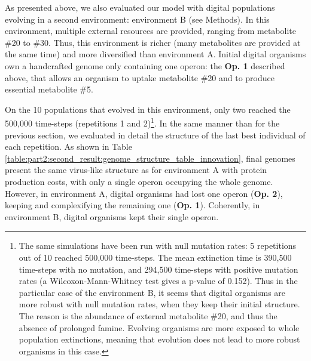 As presented above, we also evaluated our model with digital populations evolving in a second environment: environment B (see Methods). In this environment, multiple external resources are provided, ranging from metabolite \#20 to \#30. Thus, this environment is richer (many metabolites are provided at the same time) and more diversified than environment A. Initial digital organisms own a handcrafted genome only containing one operon: the \textbf{Op. 1} described above, that allows an organism to uptake metabolite \#20 and to produce essential metabolite \#5.

On the 10 populations that evolved in this environment, only two reached the 500,000 time-steps (repetitions 1 and 2)\footnote{The same simulations have been run with null mutation rates: 5 repetitions out of 10 reached 500,000 time-steps. The mean extinction time is 390,500 time-steps with no mutation, and 294,500 time-steps with positive mutation rates (a Wilcoxon-Mann-Whitney test gives a p-value of 0.152). Thus in the particular case of the environment B, it seems that digital organisms are more robust with null mutation rates, when they keep their initial structure. The reason is the abundance of external metabolite \#20, and thus the absence of prolonged famine. Evolving organisms are more exposed to whole population extinctions, meaning that evolution does not lead to more robust organisms in this case.}.
In the same manner than for the previous section, we evaluated in detail the structure of the last best individual of each repetition. As shown in Table \ref{table:part2:second_result:genome_structure_table_innovation}, final genomes present the same virus-like structure as for environment A with protein production costs, with only a single operon occupying the whole genome. However, in environment A, digital organisms had lost one operon (\textbf{Op. 2}), keeping and complexifying the remaining one (\textbf{Op. 1}). Coherently, in environment B, digital organisms kept their single operon.

\begin{table}[!ht]
\begin{adjustwidth}{-0in}{0in}
\centering
\caption[Genome structure of the last best individuals in environment B.]{{\bf Genome structure of the last best individuals in environment B.} For each last best individual, we extracted the genome size, the proportion of coding sequences, the number of functional regions, and the mean size of functional regions. 2 genomes are evaluated.}
\label{table:part2:second_result:genome_structure_table_innovation}
\end{adjustwidth}
\end{table}

